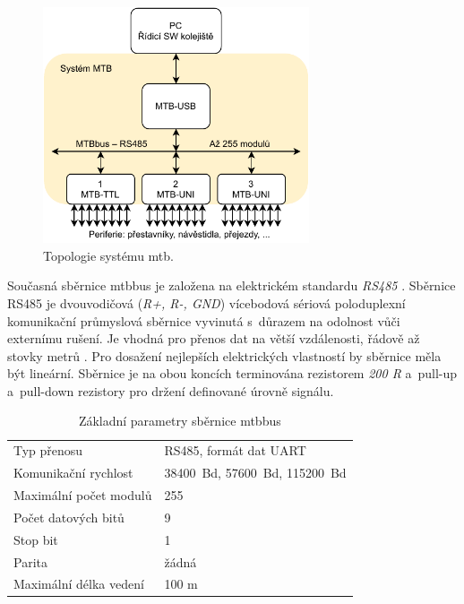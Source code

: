 \begin{figure}[ht]
\includegraphics[width=0.7\textwidth]{data/mtb-topology.pdf}
\caption{Topologie systému \gls{mtb}.}
\label{fig:mtbbus-topology}
\end{figure}

Současná sběrnice \gls{mtbbus} je založena na elektrickém standardu
\textit{RS485} \cite{mtbbus-specs}. Sběrnice RS485 je dvouvodičová (\textit{R+,
R-, GND}) vícebodová sériová poloduplexní komunikační průmyslová sběrnice
vyvinutá s~důrazem na odolnost vůči externímu rušení. Je vhodná pro přenos dat
na větší vzdálenosti, řádově až stovky metrů \cite{rs485-specs}. Pro dosažení
nejlepších elektrických vlastností by sběrnice měla být lineární. Sběrnice je
na obou koncích terminována rezistorem \textit{200 R} a~pull-up a~pull-down
rezistory pro držení definované úrovně signálu.

\begin{table}[ht]
	\begin{tabularx}{\textwidth}{XX}
		\toprule
		Typ přenosu & RS485, formát dat UART \\
		Komunikační rychlost & 38400~Bd, 57600~Bd, 115200~Bd \\
		Maximální počet modulů & 255 \\
		Počet datových bitů & 9 \\
		Stop bit & 1 \\
		Parita & žádná \\
		Maximální délka vedení & 100 m \\
		\bottomrule
	\end{tabularx}
	\caption{Základní parametry sběrnice \gls{mtbbus} \cite{mtbbus-specs}}
	\label{tab:mtbbus-params}
\end{table}

